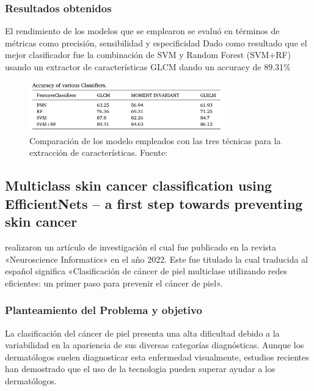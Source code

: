 \subsubsection{Resultados obtenidos}
El rendimiento de los modelos que se emplearon se evaluó en términos de métricas como precisión, sensibilidad y especificidad
Dado como resultado que el mejor clasificador fue la combinación de SVM y Random Forest (SVM+RF) usando un extractor de características GLCM dando un accuracy de 89.31\% 
\begin{figure}[h]
	\begin{center}
		\includegraphics[width=0.75\textwidth]{2/figuras/Tecnica_Diagnosis_skin_cancer_imagen_01.png}
		\caption{Comparación de los modelo empleados con las  tres técnicas para la extracción de características. Fuente: \cite{murugan_2021diagnosis}}
		\label{1:fig}
	\end{center}
\end{figure}






\subsection{Multiclass skin cancer classification using EfficientNets – a first step towards preventing skin cancer \citep*{ali_2022multiclass}}
\citeauthor{ali_2022multiclass} realizaron un artículo de investigación el cual fue publicado en la revista «Neuroscience Informatics» en el año 2022. Este fue titulado  la cual traducida al español significa «Clasificación de cáncer de piel multiclase utilizando redes eficientes: un primer paso para prevenir el cáncer de piel».




\subsubsection{Planteamiento del Problema y objetivo}

La clasificación del cáncer de piel presenta una alta dificultad debido a la variabilidad en la apariencia de sus diversas categorías diagnósticas. Aunque los dermatólogos suelen diagnosticar esta enfermedad visualmente, estudios recientes han demostrado que el uso de la  tecnologia pueden superar ayudar a los dermatólogos.

